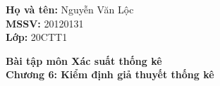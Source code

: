 \documentclass[12pt,a4paper]{article}
\author{Nguyễn Văn Lộc}
\begin{document}
    \fancyhf{}
    \lhead{}
    \chead{}
    \rhead{}
    \cfoot{}
    \rfoot{\thepage}
    \lfoot{}
    \pagestyle{fancy}
    \renewcommand{\headrulewidth}{0pt}
    \renewcommand{\footrulewidth}{0pt}
    \begin{mybox}
    \textbf{Họ và tên:} Nguyễn Văn Lộc\\
    \textbf{MSSV:} 20120131\\
    \textbf{Lớp:} 20CTT1
    \end{mybox}
    \begin{center}
    \fontsize{16}{14}\selectfont
    \textbf{Bài tập môn Xác suất thống kê}\\
    \textbf{Chương 6: Kiểm định giả thuyết thống kê}
    \end{center}
    




\end{document}
